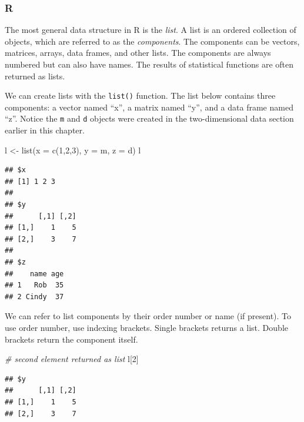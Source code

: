 \documentclass[
]{book}
\newenvironment{Shaded}{\begin{snugshade}}{\end{snugshade}}
\newcommand{\AttributeTok}[1]{\textcolor[rgb]{0.77,0.63,0.00}{#1}}
\newcommand{\CommentTok}[1]{\textcolor[rgb]{0.56,0.35,0.01}{\textit{#1}}}
\newcommand{\DecValTok}[1]{\textcolor[rgb]{0.00,0.00,0.81}{#1}}
\newcommand{\FunctionTok}[1]{\textcolor[rgb]{0.00,0.00,0.00}{#1}}
\newcommand{\NormalTok}[1]{#1}
\newcommand{\OtherTok}[1]{\textcolor[rgb]{0.56,0.35,0.01}{#1}}
\begin{document}
\hypertarget{r-11}{%
\subsubsection*{R}\label{r-11}}

The most general data structure in R is the \emph{list}. A list is an ordered collection of objects, which are referred to as the \emph{components}. The components can be vectors, matrices, arrays, data frames, and other lists. The components are always numbered but can also have names. The results of statistical functions are often returned as lists.

We can create lists with the \texttt{list()} function. The list below contains three components: a vector named ``x'', a matrix named ``y'', and a data frame named ``z''. Notice the \texttt{m} and \texttt{d} objects were created in the two-dimensional data section earlier in this chapter.

\begin{Shaded}
\begin{Highlighting}[]
\NormalTok{l }\OtherTok{\textless{}{-}} \FunctionTok{list}\NormalTok{(}\AttributeTok{x =} \FunctionTok{c}\NormalTok{(}\DecValTok{1}\NormalTok{,}\DecValTok{2}\NormalTok{,}\DecValTok{3}\NormalTok{),}
          \AttributeTok{y =}\NormalTok{ m,}
          \AttributeTok{z =}\NormalTok{ d)}
\NormalTok{l}
\end{Highlighting}
\end{Shaded}

\begin{verbatim}
## $x
## [1] 1 2 3
## 
## $y
##      [,1] [,2]
## [1,]    1    5
## [2,]    3    7
## 
## $z
##    name age
## 1   Rob  35
## 2 Cindy  37
\end{verbatim}

We can refer to list components by their order number or name (if present). To use order number, use indexing brackets. Single brackets returns a list. Double brackets return the component itself.

\begin{Shaded}
\begin{Highlighting}[]
\CommentTok{\# second element returned as list}
\NormalTok{l[}\DecValTok{2}\NormalTok{]}
\end{Highlighting}
\end{Shaded}

\begin{verbatim}
## $y
##      [,1] [,2]
## [1,]    1    5
## [2,]    3    7
\end{verbatim}
\end{document}
